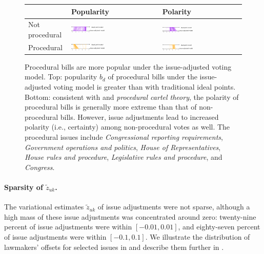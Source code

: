 \begin{figure}
  \begin{tabular}{|m{0.85in}|m{2.54in}|m{2.54in}|}
    \hline
    & Popularity & Polarity \\
    \hline
    Not procedural &
    \includegraphics[width=0.4\textwidth]{chapter_inferring_issue_preferences/figures/3398_noprocedural_popularity.pdf} &
    \includegraphics[width=0.4\textwidth]{chapter_inferring_issue_preferences/figures/3398_noprocedural_polarity.pdf} \\
    Procedural &
    \includegraphics[width=0.4\textwidth]{chapter_inferring_issue_preferences/figures/3398_procedural_popularity.pdf} &
    \includegraphics[width=0.4\textwidth]{chapter_inferring_issue_preferences/figures/3398_procedural_polarity.pdf} \\
    \hline
  \end{tabular}
  \caption{Procedural bills are more popular under the issue-adjusted
    voting model. Top: popularity $b_d$ of procedural bills under the
    issue-adjusted voting model is greater than with traditional ideal
    points.  Bottom: consistent with \citet{cox:2002} and
    \emph{procedural cartel theory}, the polarity of procedural bills
    is generally more extreme than that of non-procedural bills.
    However, issue adjustments lead to increased polarity (i.e.,
    certainty) among non-procedural votes as well.  The procedural
    issues include \emph{Congressional reporting requirements},
    \emph{Government operations and politics}, \emph{House of
      Representatives}, \emph{House rules and procedure},
    \emph{Legislative rules and procedure}, and \emph{Congress}.}
  \label{fig:bills_parameter_changes}
\end{figure}

\paragraph{Sparsity of $\tilde z_{uk}$.}
The variational estimates $\tilde z_{uk}$ of issue adjustments were
not sparse, although a high mass of these issue adjustments was
concentrated around zero: twenty-nine percent of issue adjustments
were within $[-0.01, 0.01]$, and eighty-seven percent of issue
adjustments were within $[-0.1, 0.1]$.  We illustrate the distribution
of lawmakers' offsets for selected issues in
 and describe them further in
.

